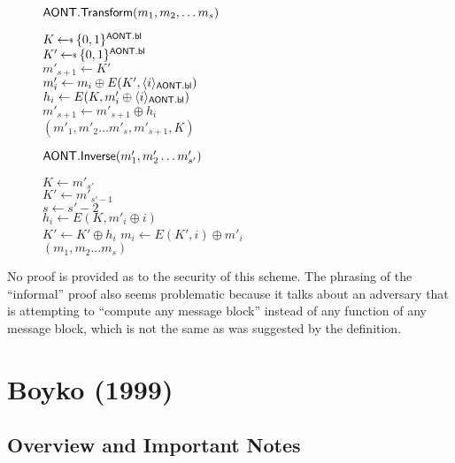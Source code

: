 \documentclass[11pt,twoside]{article}
\begin{document}
\begin{figure}[h]
{
\underline{$\mathsf{AONT.Transform}(m_1,m_2,\dots m_s)$}

\begin{algorithm}[H]
$K\getsr \bits^\schemefont{AONT.bl}$\\
$K'\getsr \bits^\schemefont{AONT.bl}$\\
$m'_{s+1}\gets K'$\\
{
$m'_i\gets m_i \oplus E(K',\langle i \rangle_{\mathsf{AONT.bl}})$\\
$h_i\gets E(K,m'_i\oplus \langle i \rangle_{\mathsf{AONT.bl}})$\\
$m'_{s+1}\gets m'_{s+1}\oplus h_i$\\
}
\Return $(m'_1,m'_2\dots m'_s, m'_{s+1}, K)$
\end{algorithm}
}
{
\underline{$\mathsf{AONT.Inverse}(m'_1,m'_2\dots m'_{s'})$}

\begin{algorithm}[H]
$K\gets m'_{s'}$\\
$K'\gets m'_{s'-1}$\\
$s\gets s'-2$\\
{
$h_i\gets E(K,m'_i\oplus i)$\\
$K'\gets K'\oplus h_i$
}
{
$m_i\gets E(K',i)\oplus m'_i$\\
}
\Return $(m_1,m_2\dots m_{s})$
\end{algorithm}
}
\end{figure} 
No proof is provided as to the security of this scheme. The phrasing of the ``informal'' proof also seems problematic because it talks about an adversary that is attempting to ``compute any message block'' instead of any function of any message block, which is not the same as was suggested by the definition.

\pagebreak 

\section{Boyko (1999)}

\subsection{Overview and Important Notes} 
\end{document}
